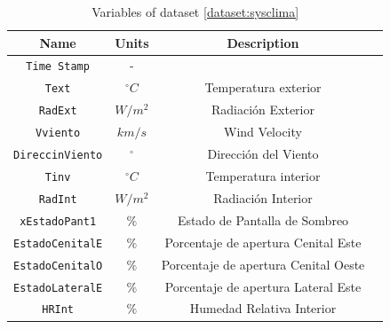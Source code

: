 \begin{table}
    \centering
    \begin{tabular}{|c|c|c|c|}
        \hline
        \textbf{Name}           & \textbf{Units} & \textbf{Description}         \\ 
        \hline
        \texttt{Time Stamp}         & -              &                              \\ \hline
        \texttt{Text}               & $^\circ C$     & Temperatura exterior         \\ \hline
        \texttt{RadExt}             & $W/m^2$        & Radiación Exterior           \\ \hline
        \texttt{Vviento}            & $km/s$         & Wind Velocity                \\  \hline
        \texttt{DireccinViento}     & $^\circ$       & Dirección del Viento         \\ \hline
        \texttt{Tinv}               & $^\circ C$     & Temperatura interior         \\ \hline
        \texttt{RadInt}             & $W/m^2$        & Radiación Interior               \\ \hline
        \texttt{xEstadoPant1}       & $\%$           & Estado de Pantalla de Sombreo    \\ \hline
        \texttt{EstadoCenitalE}     & $\%$           & Porcentaje de apertura Cenital Este      \\ \hline
        \texttt{EstadoCenitalO}     & $\%$           & Porcentaje de apertura Cenital Oeste     \\ \hline
        \texttt{EstadoLateralE}     & $\%$           & Porcentaje de apertura Lateral Este      \\ \hline
        \texttt{HRInt}              & $\%$           & Humedad Relativa Interior                             \\ 
        \hline
    \end{tabular}
    \caption{Variables of dataset \ref{dataset:sysclima}}
    \label{table:SysClimaDS}
\end{table}
